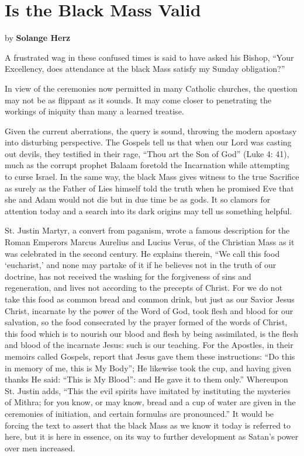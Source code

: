 \section{Is the Black Mass Valid}

\label{sec:BlackMass}
by \textbf{Solange Herz}

A frustrated wag in these confused times is said to have asked his Bishop, ``Your Excellency, does attendance at the black Mass satisfy my Sunday obligation?''

In view of the ceremonies now permitted in many Catholic churches, the question may not be as flippant as it sounds. It may come closer to penetrating the workings of iniquity than many a learned treatise.

Given the current aberrations, the query is sound, throwing the modern apostasy into disturbing perspective. The Gospels tell us that when our Lord was casting out devils, they testified in their rage, ``Thou art the Son of God'' (Luke 4: 41), much as the corrupt prophet Balaam foretold the Incarnation while attempting to curse Israel. In the same way, the black Mass gives witness to the true Sacrifice as surely as the Father of Lies himself told the truth when he promised Eve that she and Adam would not die but in due time be as gods. It so clamors for attention today and a search into its dark origins may tell us something helpful.

St. Justin Martyr, a convert from paganism, wrote a famous description for the Roman Emperors Marcus Aurelius and Lucius Verus, of the Christian Mass as it was celebrated in the second century. He explains therein, ``We call this food `eucharist,' and none may partake of it if he believes not in the truth of our doctrine, has not received the washing for the forgiveness of sins and regeneration, and lives not according to the precepts of Christ. For we do not take this food as common bread and common drink, but just as our Savior Jesus Christ, incarnate by the power of the Word of God, took flesh and blood for our salvation, so the food consecrated by the prayer formed of the words of Christ, this food which is to nourish our blood and flesh by being assimilated, is the flesh and blood of the incarnate Jesus: such is our teaching. For the Apostles, in their memoirs called Gospels, report that Jesus gave them these instructions: ``Do this in memory of me, this is My Body''; He likewise took the cup, and having given thanks He said: ``This is My Blood'': and He gave it to them only.'' Whereupon St. Justin adds, ``This the evil spirits have imitated by instituting the mysteries of Mithra; for you know, or may know, bread and a cup of water are given in the ceremonies of initiation, and certain formulas are pronounced.'' It would be forcing the text to assert that the black Mass as we know it today is referred to here, but it is here in essence, on its way to further development as Satan's power over men increased.

